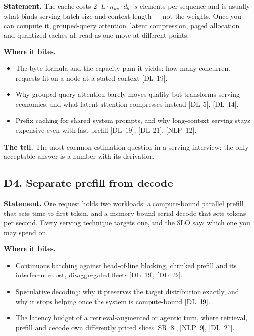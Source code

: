 \textbf{Statement.} The cache costs $2 \cdot L \cdot n_{kv} \cdot d_h \cdot s$ elements per sequence and is usually what binds serving batch size and context length --- not the weights. Once you can compute it, grouped-query attention, latent compression, paged allocation and quantized caches all read as one move at different points.

\textbf{Where it bites.}
\begin{itemize}[itemsep=1pt,topsep=2pt,leftmargin=1.3em]
\item The byte formula and the capacity plan it yields: how many concurrent requests fit on a node at a stated context [DL~19].
\item Why grouped-query attention barely moves quality but transforms serving economics, and what latent attention compresses instead [DL~5], [DL~14].
\item Prefix caching for shared system prompts, and why long-context serving stays expensive even with fast prefill [DL~19], [DL~21], [NLP~12].
\end{itemize}

\textbf{The tell.} The most common estimation question in a serving interview; the only acceptable answer is a number with its derivation.

\subsection*{D4. Separate prefill from decode}

\textbf{Statement.} One request holds two workloads: a compute-bound parallel prefill that sets time-to-first-token, and a memory-bound serial decode that sets tokens per second. Every serving technique targets one, and the SLO says which one you may spend on.

\textbf{Where it bites.}
\begin{itemize}[itemsep=1pt,topsep=2pt,leftmargin=1.3em]
\item Continuous batching against head-of-line blocking, chunked prefill and its interference cost, disaggregated fleets [DL~19], [DL~22].
\item Speculative decoding: why it preserves the target distribution exactly, and why it stops helping once the system is compute-bound [DL~19].
\item The latency budget of a retrieval-augmented or agentic turn, where retrieval, prefill and decode own differently priced slices [SR~8], [NLP~9], [DL~27].
\end{itemize}

